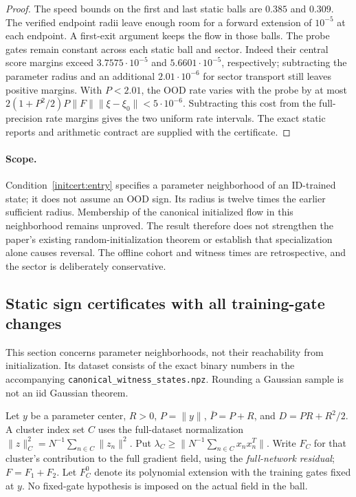 \documentclass[10pt]{article}
\begin{document}
\begin{proof}
The speed bounds on the first and last static balls are $0.385$ and
$0.309$. The verified endpoint radii leave enough room for a forward
extension of $10^{-5}$ at each endpoint. A first-exit argument keeps the
flow in those balls. The probe gates remain constant across each static
ball and sector. Indeed their central score margins exceed
$3.7575\cdot10^{-5}$ and $5.6601\cdot10^{-5}$, respectively;
subtracting the parameter radius and an additional $2.01\cdot10^{-6}$
for sector transport still leaves positive margins.
With $P<2.01$, the OOD rate varies with the probe by at most
$2(1+P^2/2)P\|F\|\|\xi-\xi_0\|<5\cdot10^{-6}$.
Subtracting this cost from the full-precision rate margins gives the two
uniform rate intervals. The exact static reports and arithmetic contract
are supplied with the certificate.
\end{proof}

\paragraph{Scope.}
Condition~\eqref{initcert:entry} specifies a parameter neighborhood of an
ID-trained state; it does not assume an OOD sign. Its radius is twelve times
the earlier sufficient radius. Membership of the canonical initialized flow
in this neighborhood remains unproved. The result therefore does not
strengthen the paper's existing random-initialization theorem or establish
that specialization alone causes reversal. The offline cohort and witness
times are retrospective, and the sector is deliberately conservative.

\subsection{Static sign certificates with all training-gate changes}
\label{initcert:static}
This section concerns parameter neighborhoods, not their reachability from
initialization. Its dataset consists of the exact binary numbers in the
accompanying \texttt{canonical\_witness\_states.npz}. Rounding a Gaussian
sample is not an iid Gaussian theorem.

Let $y$ be a parameter center, $R>0$, $P=\|y\|$, $\bar P=P+R$, and
$D=PR+R^2/2$. A cluster index set $C$ uses the full-dataset normalization
$\|z\|_C^2=N^{-1}\sum_{n\in C}\|z_n\|^2$. Put
$\lambda_C\ge\|N^{-1}\sum_{n\in C}x_nx_n^T\|$.
Write $F_C$ for that cluster's contribution to the full gradient field,
using the \emph{full-network residual}; $F=F_1+F_2$.
Let $F_C^0$ denote its polynomial extension with the training gates fixed
at $y$. No fixed-gate hypothesis is imposed on the actual field in the ball.
\end{document}
